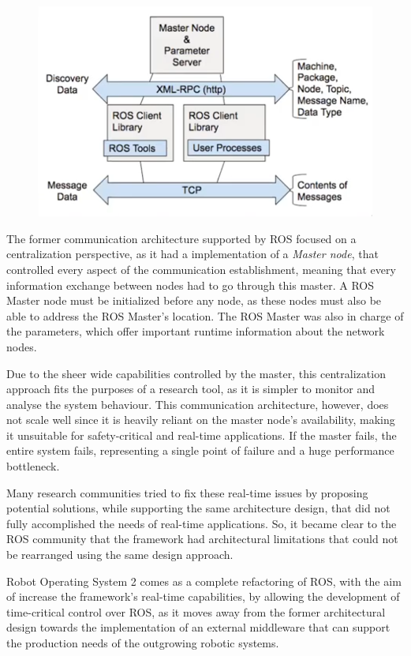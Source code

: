 \begin{figure}[H]
        \centering
         \includegraphics[width=0.5\linewidth]{images/former-ros1-architecture.png}
\end{figure}

The former communication architecture supported by ROS focused on a centralization perspective, as it had a implementation of a \textit{Master node}, that controlled every aspect of the communication establishment, meaning that every information exchange between nodes had to go through this master. A ROS Master node must be initialized before any node, as these nodes must also be able to address the ROS Master's location. The ROS Master was also in charge of the parameters, which offer important runtime information about the network nodes.

Due to the sheer wide capabilities controlled by the master, this centralization approach fits the purposes of a research tool, as it is simpler to monitor and analyse the system behaviour. This communication architecture, however, does not scale well since it is heavily reliant on the master node's availability, making it unsuitable for safety-critical and real-time applications. If the master fails, the entire system fails, representing a single point of failure and a huge performance bottleneck.

Many research communities tried to fix these real-time issues by proposing potential solutions, while supporting the same architecture design, that did not fully accomplished the needs of real-time applications. So, it became clear to the ROS community that the framework had architectural limitations that could not be rearranged using the same design approach. \cite{maruyama2016exploring}

Robot Operating System 2 comes as a complete refactoring of ROS, with the aim of increase the framework's real-time capabilities, by allowing the development of time-critical control over ROS, as it moves away from the former architectural design towards the implementation of an external middleware that can support the production needs of the outgrowing robotic systems. \cite{kim2018security, casini2019response}

